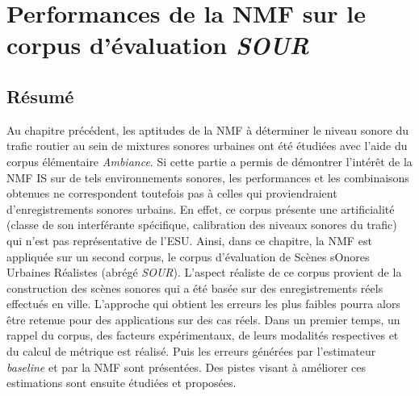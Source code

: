 
\chapter{Performances de la NMF sur le corpus d'évaluation \textit{SOUR}}
\label{chap:grafic}


\section*{\centering Résumé}



\vspace{2cm}

Au chapitre précédent, les aptitudes de la NMF à déterminer le niveau sonore du trafic routier au sein de mixtures sonores urbaines ont été étudiées avec l'aide du corpus élémentaire \textit{Ambiance}. Si cette partie a permis de démontrer l'intérêt de la NMF IS sur de tels environnements sonores, les performances et les combinaisons obtenues ne correspondent toutefois pas à celles qui proviendraient d'enregistrements sonores urbains. En effet, ce corpus présente une artificialité (classe de son interférante spécifique, calibration des niveaux sonores du trafic) qui n'est pas représentative de l'ESU. Ainsi, dans ce chapitre, la NMF est appliquée sur un second corpus, le corpus d'évaluation de Scènes sOnores Urbaines Réalistes (abrégé \textit{SOUR}). L'aspect \og réaliste \fg{} de ce corpus provient de la construction des scènes sonores qui a été basée sur des enregistrements réels effectués en ville. 
L'approche qui obtient les erreurs les plus faibles pourra alors être retenue pour des applications sur des cas réels. Dans un premier temps, un rappel du corpus, des facteurs expérimentaux, de leurs modalités respectives et du calcul de métrique est réalisé. Puis les erreurs générées par l'estimateur \textit{baseline} et par la NMF sont présentées. Des pistes visant à améliorer ces estimations sont ensuite étudiées et proposées.

